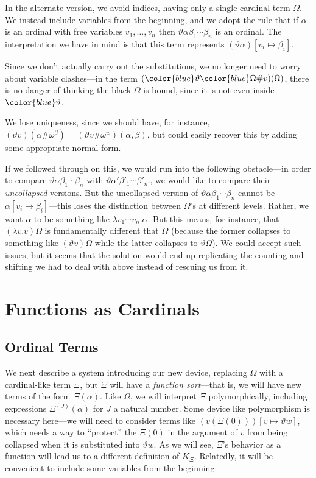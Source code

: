 \documentclass[11pt]{amsart}
\theoremstyle{definition}
\begin{document}
In the alternate version, we avoid indices, having only a single cardinal term $\Omega$. We instead include variables from the beginning, and we adopt the rule that if $\alpha$ is an ordinal with free variables $v_1,\ldots,v_n$ then $\vartheta\alpha\beta_1\cdots\beta_n$ is an ordinal. The interpretation we have in mind is that this term represents $(\vartheta\alpha)[v_i\mapsto\beta_i]$.

Since we don't actually carry out the substitutions, we no longer need to worry about variable clashes---in the term $({\color{blue}\vartheta}{\color{blue}\Omega}\#v)(\Omega)$, there is no danger of thinking the black $\Omega$ is bound, since it is not even inside ${\color{blue}\vartheta}$.

We lose uniqueness, since we should have, for instance, $(\vartheta v)(\alpha\#\omega^\beta)=(\vartheta v\#\omega^w)(\alpha,\beta)$, but could easily recover this by adding some appropriate normal form.

If we followed through on this, we would run into the following obstacle---in order to compare $\vartheta\alpha\beta_1\cdots\beta_n$ with $\vartheta\alpha'\beta'_1\cdots\beta'_{n'}$, we would like to compare their \emph{uncollapsed} versions. But the uncollapsed version of $\vartheta\alpha\beta_1\cdots\beta_n$ cannot be $\alpha[v_i\mapsto\beta_i]$---this loses the distinction between $\Omega$'s at different levels. Rather, we want $\alpha$ to be something like $\lambda v_1\cdots v_n. \alpha$. But this means, for instance, that $(\lambda v.v)\Omega$ is fundamentally different that $\Omega$ (because the former collapses to something like $(\vartheta v)\Omega$ while the latter collapses to $\vartheta\Omega$). We could accept such issues, but it seems that the solution would end up replicating the counting and shifting we had to deal with above instead of rescuing us from it.

\section{Functions as Cardinals}
\subsection{Ordinal Terms}

We next describe a system introducing our new device, replacing $\Omega$ with a cardinal-like term $\Xi$, but $\Xi$ will have a \emph{function sort}---that is, we will have new terms of the form $\Xi(\alpha)$. Like $\Omega$, we will interpret $\Xi$ polymorphically, including expressions $\Xi^{(J)}(\alpha)$ for $J$ a natural number. Some device like polymorphism is necessary here---we will need to consider terms like $(v(\Xi(0)))[v\mapsto \vartheta w]$, which needs a way to ``protect'' the $\Xi(0)$ in the argument of $v$ from being collapsed when it is substituted into $\vartheta w$. As we will see, $\Xi$'s behavior as a function will lead us to a different definition of $K_\Xi$. Relatedly, it will be convenient to include some variables from the beginning.
\end{document}
